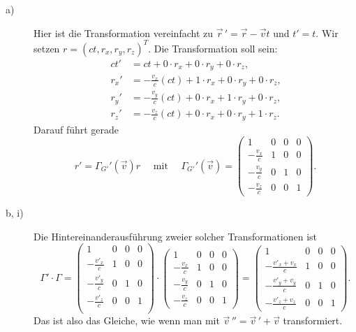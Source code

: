 \begin{description}
	\item[a)] Hier ist die Transformation vereinfacht zu $\vec{r}\,' = \vec{r} - \vec{v} t$ und $t' = t$. Wir setzen $r = (ct, r_x, r_y, r_z)^T$. Die Transformation soll sein:
	\begin{align*}
		ct' &= ct + 0 \cdot r_x + 0 \cdot r_y + 0 \cdot r_z \text{,} \\
		r_x' &= -\frac{v_x}{c} (ct) + 1 \cdot r_x + 0 \cdot r_y + 0 \cdot r_z \text{,} \\
		r_y' &= -\frac{v_y}{c} (ct) + 0 \cdot r_x + 1 \cdot r_y + 0 \cdot r_z \text{,} \\
		r_z' &= -\frac{v_z}{c} (ct) + 0 \cdot r_x + 0 \cdot r_y + 1 \cdot r_z \text{.}
	\end{align*}
	Darauf führt gerade   
	\[
		r' = \Gamma_{G'}'(\vec{v}) r 
		\quad \text{ mit } \quad 
		\Gamma_{G'}'(\vec{v}) = \begin{pmatrix}
			1 & 0 & 0 & 0 \\
			-\frac{v_x}{c} & 1 & 0 & 0 \\
			-\frac{v_y}{c} & 0 & 1 & 0 \\
			-\frac{v_z}{c} & 0 & 0 & 1
		\end{pmatrix}
		\text{.}
	\]
	
	\item[b, i)] Die Hintereinanderausführung zweier solcher Transformationen ist 
	\[
		\Gamma' \cdot \Gamma 
		= \begin{pmatrix}
			1 & 0 & 0 & 0 \\
			-\frac{v'_x}{c} & 1 & 0 & 0 \\
			-\frac{v'_y}{c} & 0 & 1 & 0 \\
			-\frac{v'_z}{c} & 0 & 0 & 1 \\
		\end{pmatrix}
		\cdot
		\begin{pmatrix}
			1 & 0 & 0 & 0 \\
			-\frac{v_x}{c} & 1 & 0 & 0 \\
			-\frac{v_y}{c} & 0 & 1 & 0 \\
			-\frac{v_z}{c} & 0 & 0 & 1 
		\end{pmatrix}
		= \begin{pmatrix}
			1 & 0 & 0 & 0 \\
			-\frac{v'_x + v_x}{c} & 1 & 0 & 0 \\
			-\frac{v'_y + v_y}{c} & 0 & 1 & 0 \\
			-\frac{v'_z + v_z}{c} & 0 & 0 & 1 
		\end{pmatrix}
		\text{.}
	\]
	Das ist also das Gleiche, wie wenn man mit $\vec{v}\,'' = \vec{v}\,' + \vec{v}$ transformiert.
	

\end{description}
